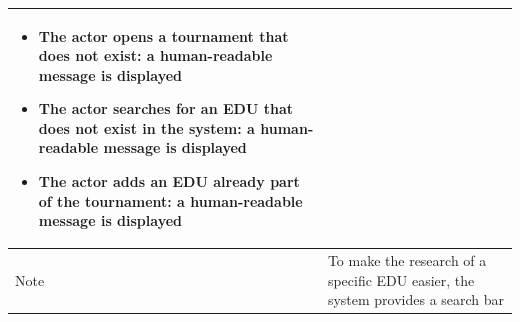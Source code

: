 \begin{center}
\begin{tabular}{| m{2cm} | m{10cm}|}
\begin{itemize}
                                    \item The actor opens a tournament that does not exist: a human-readable message is displayed
                                    \item The actor searches for an EDU that does not exist in the system: a human-readable message is displayed
                                    \item The actor adds an EDU already part of the tournament: a human-readable message is displayed
                                \end{itemize}                                                                                                           \\ \hline
        Note                  & To make the research of a specific EDU easier, the system provides a search bar                                         \\ \hline
    \end{tabular}
\end{center}

